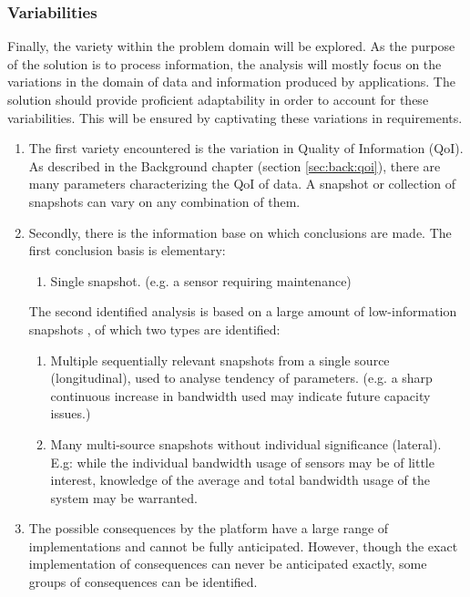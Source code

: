 \subsubsection*{Variabilities}
Finally, the variety within the problem domain will be explored. As the purpose of the solution is to process information, the analysis will mostly focus on the variations in the domain of data and information produced by applications. The solution should provide proficient adaptability in order to account for these variabilities. This will be ensured by captivating these variations in requirements.
\begin{enumerate}[label=V\archid .\arabic*]
\nospace
\item \label{v:qoi} The first variety  encountered is the variation in Quality of Information (QoI). As described in the Background chapter (section \ref{sec:back:qoi}), there are many parameters characterizing the QoI of data. A snapshot or collection of snapshots can vary on any combination of them.
\item \label{v:conclusion_basis} Secondly, there is the information base on which conclusions are made. The first conclusion basis is elementary:
\begin{enumerate}
\nospace
\item Single snapshot. (e.g. a sensor requiring maintenance)
\end{enumerate}
The second identified analysis is based on a large amount of low-information snapshots \cite{qos_difficult}, of which two types are identified:
\begin{enumerate}[resume]
\nospace
\item Multiple sequentially relevant snapshots from a single source (longitudinal), used to analyse tendency of parameters. (e.g. a sharp continuous increase in bandwidth used may indicate future capacity issues.)
\item Many multi-source snapshots without individual significance (lateral). E.g: while the individual bandwidth usage of sensors may be of little interest, knowledge of the average and total bandwidth usage of the system may be warranted.
\end{enumerate}
\item \label{v:consequence} The possible consequences by the platform have a large range of implementations and cannot be fully anticipated. However, though the exact implementation of consequences can never be anticipated exactly, some groups of consequences can be identified.
\begin{enumerate}

\end{enumerate}
\end{enumerate}
